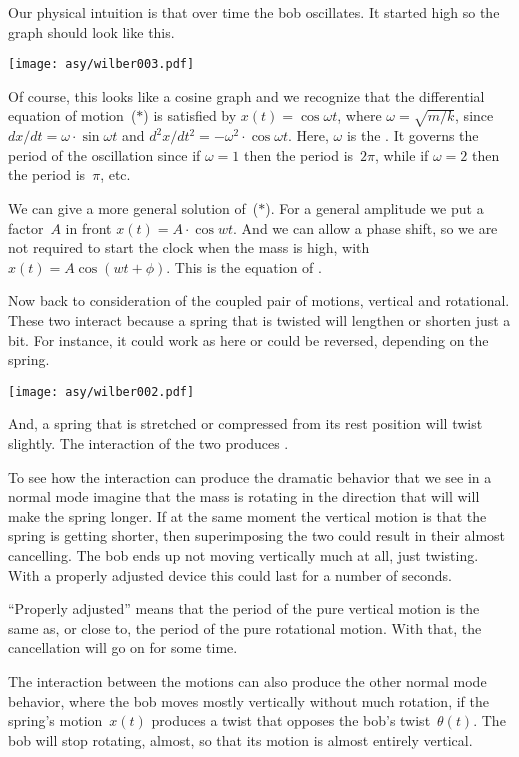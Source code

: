 Our physical intuition is that over time the bob oscillates.
It started high so 
the graph should look like this.
\begin{center}
  \texttt{[image: asy/wilber003.pdf]}
\end{center}
Of course, this looks like a cosine graph and we recognize 
that the differential equation of motion~($*$) is satisfied by
$x(t)=\cos \omega t$, where $\omega=\sqrt{m/k}$,
since $dx/dt=\omega\cdot \sin \omega t$
and $d^2x/dt^2=-\omega^2\cdot \cos \omega t$.
Here, $\omega$ is the .
It governs the period of the oscillation since if $\omega=1$ then the
period is~$2\pi$, while if $\omega=2$ then the period is~$\pi$, etc.

We can give a more general solution of~($*$).
For a general amplitude we put a factor~$A$ in front
$x(t)=A\cdot \cos wt$.
And we can allow a phase shift, 
so we are not required to start the clock when the
mass is high, with 
$x(t)=A\cos (wt+\phi)$.
This is the equation of .

Now back to consideration of the coupled pair of motions, 
vertical and rotational.
These two interact because a spring that is twisted will 
lengthen or shorten just a bit.
For instance, it could work as here or could be reversed, depending on the
spring.  
\begin{center}
  \texttt{[image: asy/wilber002.pdf]}
\end{center}
And, a spring that is stretched or compressed from its rest
position will twist slightly.
The interaction of the two produces .

To see how the interaction can produce the dramatic behavior that
we see in a normal mode
imagine that the mass is rotating in the direction that will 
will make the spring longer.
If at the same moment the vertical motion is that the spring 
is getting shorter, 
then superimposing the two
could result in their almost cancelling.
The bob ends up not moving vertically much at all, just twisting.
With a properly adjusted device this could last for a number of seconds.

``Properly adjusted'' means that  
the period of the pure vertical motion is the same as, 
or close to, the period of the pure rotational motion.
With that, the cancellation will go on for some time. 

The interaction between the motions can also produce the other normal mode 
behavior, where the bob moves mostly vertically without much rotation,
if the spring's motion~$x(t)$ 
produces a twist that opposes the bob's twist~$\theta(t)$.
The bob will stop rotating, almost, so that
its motion is almost entirely vertical.

